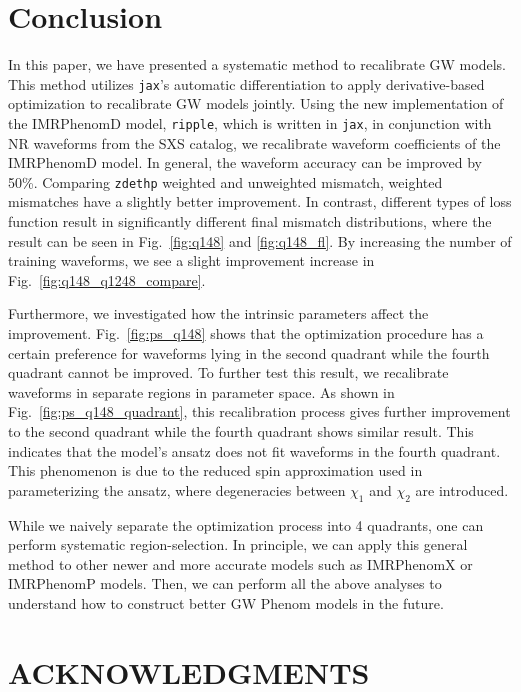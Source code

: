 \documentclass[twocolumn]{aastex631}
\newcommand{\ripple}{\texttt{ripple}}
\newcommand{\jax}{\texttt{jax}}
\newcommand{\zdethp}{\texttt{zdethp}}
\begin{document}

\section{Conclusion} \label{sec:conclusion}

In this paper, we have presented a systematic method to recalibrate GW models. This method utilizes {\jax}'s automatic differentiation to apply derivative-based optimization to recalibrate GW models jointly. Using the new implementation of the IMRPhenomD model, {\ripple}, which is written in \jax, in conjunction with NR waveforms from the SXS catalog, we recalibrate waveform coefficients of the IMRPhenomD model. In general, the waveform accuracy can be improved by 50\%. Comparing {\zdethp} weighted and unweighted mismatch, weighted mismatches have a slightly better improvement. In contrast, different types of loss function result in significantly different final mismatch distributions, where the result can be seen in Fig.~\ref{fig:q148} and \ref{fig:q148_fl}. By increasing the number of training waveforms, we see a slight improvement increase in Fig.~\ref{fig:q148_q1248_compare}. 

Furthermore, we investigated how the intrinsic parameters affect the improvement. Fig.~\ref{fig:ps_q148} shows that the optimization procedure has a certain preference for waveforms lying in the second quadrant while the fourth quadrant cannot be improved. To further test this result, we recalibrate waveforms in separate regions in parameter space. As shown in Fig.~\ref{fig:ps_q148_quadrant}, this recalibration process gives further improvement to the second quadrant while the fourth quadrant shows similar result. This indicates that the model's ansatz does not fit waveforms in the fourth quadrant. This phenomenon is due to the reduced spin approximation used in parameterizing the ansatz, where degeneracies between $\chi_1$ and $\chi_2$ are introduced. 

While we naively separate the optimization process into 4 quadrants, one can perform systematic region-selection. In principle, we can apply this general method to other newer and more accurate models such as IMRPhenomX or IMRPhenomP models. Then, we can perform all the above analyses to understand how to construct better GW Phenom models in the future.  



\section{ACKNOWLEDGMENTS}



\end{document}
